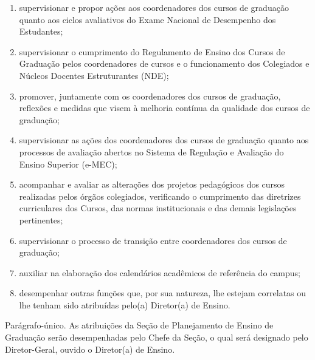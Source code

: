 \documentclass[a4paper,12pt]{report}
\begin{document}
\begin{enumerate}
\renewcommand{\labelenumi}{\Roman{enumi}}

\item supervisionar e propor ações aos coordenadores dos cursos de graduação quanto aos 
      ciclos avaliativos do Exame Nacional de Desempenho dos Estudantes;
      
\item supervisionar o cumprimento do Regulamento de Ensino dos Cursos de Graduação pelos 
      coordenadores de cursos  e o funcionamento dos Colegiados e Núcleos Docentes 
      Estruturantes (NDE);
      
\item promover, juntamente com os coordenadores dos cursos de graduação, reflexões e 
      medidas que visem à melhoria contínua da qualidade dos cursos de graduação;
      
\item supervisionar as ações dos coordenadores dos cursos de graduação quanto aos processos 
      de avaliação abertos no Sistema de Regulação e Avaliação do Ensino Superior (e-MEC);
      
\item acompanhar e avaliar as alterações dos projetos pedagógicos dos cursos realizadas 
      pelos órgãos colegiados, verificando o cumprimento das diretrizes curriculares dos 
      Cursos, das normas institucionais e das demais legislações pertinentes;

\item supervisionar o processo de transição entre coordenadores dos cursos de graduação;

\item auxiliar na elaboração dos calendários acadêmicos de referência do campus;

\item desempenhar outras funções que, por sua natureza, lhe estejam correlatas ou lhe 
      tenham sido atribuídas pelo(a) Diretor(a) de Ensino.
\end{enumerate}

Parágrafo-único. As atribuições da Seção de Planejamento de Ensino de Graduação serão 
desempenhadas pelo Chefe da Seção, o qual será designado pelo Diretor-Geral, ouvido 
o Diretor(a) de Ensino.

\end{document}
